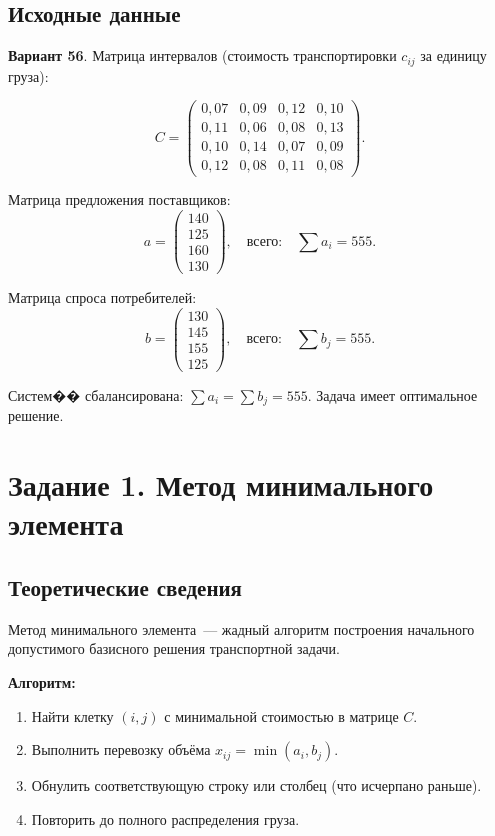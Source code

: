 \documentclass[a4paper, final]{article}
\begin{document}
\subsection{Исходные данные}

\textbf{Вариант 56}. Матрица интервалов (стоимость транспортировки $c_{ij}$ за единицу груза):

\[
C = \begin{pmatrix}
0{,}07 & 0{,}09 & 0{,}12 & 0{,}10 \\
0{,}11 & 0{,}06 & 0{,}08 & 0{,}13 \\
0{,}10 & 0{,}14 & 0{,}07 & 0{,}09 \\
0{,}12 & 0{,}08 & 0{,}11 & 0{,}08
\end{pmatrix}.
\]

Матрица предложения поставщиков:
\[
a = \begin{pmatrix} 140 \\ 125 \\ 160 \\ 130 \end{pmatrix}, \quad \text{всего:} \quad \sum a_i = 555.
\]

Матрица спроса потребителей:
\[
b = \begin{pmatrix} 130 \\ 145 \\ 155 \\ 125 \end{pmatrix}, \quad \text{всего:} \quad \sum b_j = 555.
\]

Систем�� сбалансирована: $\sum a_i = \sum b_j = 555$. Задача имеет оптимальное решение.

\newpage

\section{Задание 1. Метод минимального элемента}

\subsection{Теоретические сведения}

Метод минимального элемента~--- жадный алгоритм построения начального допустимого
базисного решения транспортной задачи.

\textbf{Алгоритм:}
\begin{enumerate}
    \item Найти клетку $(i,j)$ с минимальной стоимостью в матрице $C$.
    \item Выполнить перевозку объёма $x_{ij} = \min(a_i, b_j)$.
    \item Обнулить соответствующую строку или столбец (что исчерпано раньше).
    \item Повторить до полного распределения груза.
\end{enumerate}
\end{document}
